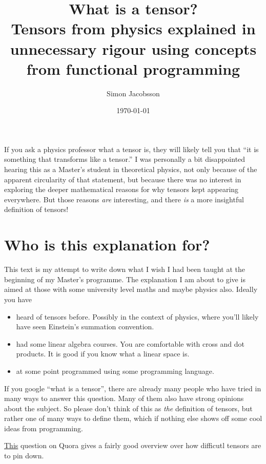 \documentclass[english, 12pt]{article}
\title{What is a tensor?\\Tensors from physics explained in unnecessary rigour using concepts from functional programming\\\ding{166}}
\author{Simon Jacobsson}
\date{\today}
\begin{document}
 
\maketitle

If you ask a physics professor what a tensor is, they will likely tell you that \enquote{it is something that transforms like a tensor.}
I was personally a bit disappointed hearing this as a Master's student in theoretical physics, not only because of the apparent circularity of that statement, but because there was no interest in exploring the deeper mathematical reasons for why tensors kept appearing everywhere.
But those reasons \emph{are} interesting, and there \emph{is} a more insightful definition of tensors!

\section{Who is this explanation for?}%
\label{sec:who_is_this_explanation_for_}

This text is my attempt to write down what I wish I had been taught at the beginning of my Master's programme.
The explanation I am about to give is aimed at those with some university level maths and maybe physics also.
Ideally you have
\begin{itemize}
	\item heard of tensors before.
	Possibly in the context of physics, where you'll likely have seen Einstein's summation convention.
	\item had some linear algebra courses.
	You are comfortable with cross and dot products.
	It is good if you know what a linear space is.
	\item at some point programmed using some programming language.
\end{itemize}

If you google \enquote{what is a tensor}, there are already many people who have tried in many ways to answer this question.
Many of them also have strong opinions about the subject.
So please don't think of this as \emph{the} definition of tensors, but rather one of many ways to define them, which if nothing else shows off some cool ideas from programming.

\href{https://www.quora.com/Why-is-it-difficult-to-explain-tensors?}{\color{blue}This} question on Quora gives a fairly good overview over how difficutl tensors are to pin down.
\end{document}
